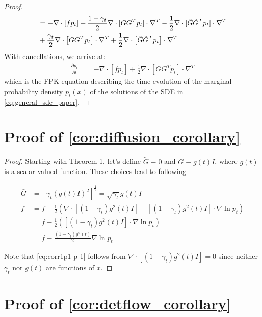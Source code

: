 \begin{proof}
\begin{align}
\begin{split}
&= -\nabla \cdot [fp_t] + \frac{1-\gamma_t}{2}\nabla \cdot [GG^Tp_t] \cdot \nabla^T - \frac{1}{2}\nabla \cdot [\tilde G\tilde G^Tp_t] \cdot \nabla^T \\
&+ \frac{\gamma_t}{2}\nabla \cdot\left[GG^Tp_t \right] \cdot \nabla^T + \frac{1}{2}\nabla \cdot\left[\tilde G\tilde G^Tp_t \right] \cdot \nabla^T
\end{split}
\end{align}
With cancellations, we arrive at:
\begin{align}
\frac{\partial p_t}{\partial t} &= -\nabla \cdot [fp_t] + \frac{1}{2}\nabla \cdot [GG^Tp_t] \cdot \nabla^T
\end{align}
which is the FPK equation describing the time evolution of the marginal probability density $p_t(x)$ of the solutions of the SDE in \cref{eq:general_sde_paper}.

\end{proof}

\section{Proof of \cref{cor:diffusion_corollary}}
\label{sec:corollaryone_proof_app}

\corollaryone*
\begin{proof}
Starting with Theorem 1, let's define $\tilde G \equiv 0$ and $G \equiv g(t)I$, where $g(t)$ is a scalar valued function. These choices lead to following

\begin{align}
\bar G &= [\gamma_t(g(t)I)^2]^{\frac{1}{2}} = \sqrt{\gamma_t}g(t)I \\
\bar f &= f - \frac{1}{2}\left(\nabla \cdot [(1-\gamma_t)g^2(t)I] + [(1-\gamma_t)g^2(t)I]\cdot\nabla\ln p_t \right)\\
&= f - \frac{1}{2}\left([(1-\gamma_t)g^2(t)I]\cdot\nabla\ln p_t \right) \label{eq:corr1p1-p-1} \\
&= f - \frac{(1-\gamma_t)g^2(t)}{2}\nabla\ln p_t
\end{align}

Note that \cref{eq:corr1p1-p-1} follows from $\nabla \cdot [(1-\gamma_t)g^2(t)I] = 0$ since neither $\gamma_t$ nor $g(t)$ are functions of $x$.
\end{proof}

\section{Proof of \cref{cor:detflow_corollary}}
\label{sec:corollarytwo_proof_app}

